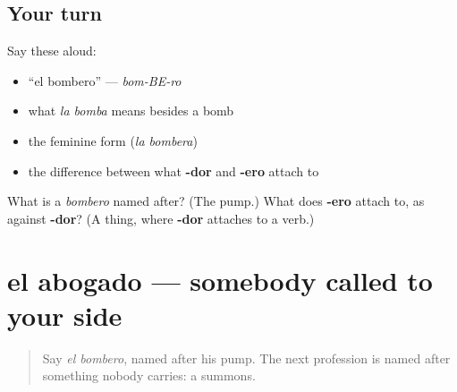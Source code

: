 \subsection*{Your turn}
Say these aloud:

\begin{itemize}
\raggedright
  \item \textquotedblleft{}el bombero\textquotedblright{} — \emph{bom-BE-ro}
  \item what \emph{la bomba} means besides a bomb
  \item the feminine form (\emph{la bombera})
  \item the difference between what \textbf{-dor} and \textbf{-ero} attach to
\end{itemize}

\begin{tcolorbox}[breakable,colback=teal!4,colframe=teal!35!black,title={Before you move on}]
What is a \emph{bombero} named after? (The pump.) What does \textbf{-ero} attach to, as against \textbf{-dor}? (A thing, where \textbf{-dor} attaches to a verb.)
\end{tcolorbox}
\section[el abogado]{el abogado — somebody called to your side}

\label{lesson:ES-C427-abogado}



\begin{quote}
Say \emph{el bombero}, named after his pump. The next profession is named after something nobody carries: a summons.
\end{quote}

